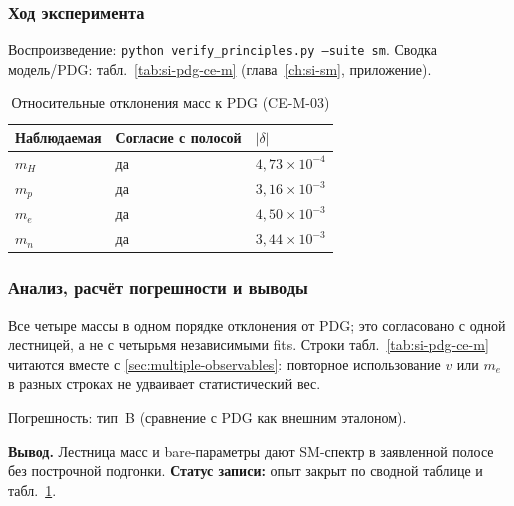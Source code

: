 \subsubsection*{Ход эксперимента}
Воспроизведение: \texttt{python verify\_principles.py --suite sm}.
Сводка модель/PDG: табл.~\ref{tab:si-pdg-ce-m} (глава~\cref{ch:si-sm}, приложение).

\begin{table}[htbp]
\centering
\small
\caption{Относительные отклонения масс к PDG (CE-M-03)}
\label{tab:exp-ce-m-03-checks}
\begin{tabular}{@{}lll@{}}
\toprule
Наблюдаемая & Согласие с полосой & $|\delta|$ \\
\midrule
$m_H$ & да & $4{,}73\times 10^{-4}$ \\
$m_p$ & да & $3{,}16\times 10^{-3}$ \\
$m_e$ & да & $4{,}50\times 10^{-3}$ \\
$m_n$ & да & $3{,}44\times 10^{-3}$ \\
\bottomrule
\end{tabular}
\end{table}

\subsubsection*{Анализ, расчёт погрешности и выводы}
Все четыре массы в одном порядке отклонения от PDG; это согласовано с одной лестницей, а не с четырьмя независимыми fits.
Строки табл.~\ref{tab:si-pdg-ce-m} читаются вместе с \cref{sec:multiple-observables}: повторное использование $v$ или $m_e$ в разных строках не удваивает статистический вес.

Погрешность: тип~B (сравнение с PDG как внешним эталоном).

\textbf{Вывод.}
Лестница масс и bare-параметры дают SM-спектр в заявленной полосе без построчной подгонки.
\textbf{Статус записи:} опыт закрыт по сводной таблице и табл.~\ref{tab:exp-ce-m-03-checks}.
